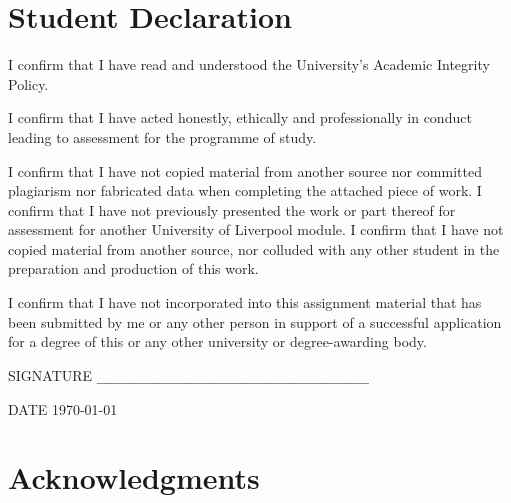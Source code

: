 \documentclass[a4paper,11pt]{report}
\begin{document}
\chapter*{\center Student Declaration} 

I confirm that I have read and understood the University's Academic Integrity Policy.

I confirm that I have acted honestly, ethically and professionally in conduct leading
to assessment for the programme of study.  

I confirm that I have not copied material from another source nor committed plagiarism
nor fabricated data when completing the attached piece of work.  I confirm that I have 
not previously presented the work or part thereof for assessment for another University
of Liverpool module.  I confirm that I have not copied material from another source, nor
colluded with any other student in the preparation and production of this work.  

I confirm that I have not incorporated into this assignment material that has been 
submitted by me or any other person in support of a successful application for a 
degree of this or any other university or degree-awarding body.  

\vspace*{1in}

\noindent SIGNATURE \verb!______________________________________!

\noindent DATE \hspace*{.4in}  \today

\vspace*{1in}




\newpage


\chapter*{\center Acknowledgments}
\end{document}
